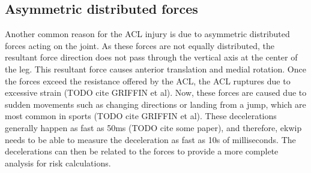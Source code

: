 \subsection{Asymmetric distributed forces}
Another common reason for the ACL injury is due to asymmetric distributed forces acting on the joint. As these forces are not equally distributed, the resultant force direction does not pass through the vertical axis at the center of the leg. This resultant force causes anterior translation and medial rotation. Once the forces exceed the resistance offered by the ACL,  the ACL ruptures due to excessive strain (TODO cite GRIFFIN et al). Now, these forces are caused due to sudden movements such as changing directions or landing from a jump, which are most common in sports (TODO cite GRIFFIN et al). These decelerations generally happen as fast as 50ms (TODO cite some paper), and therefore, ekwip needs to be able to measure the deceleration as fast as 10s of milliseconds. The decelerations can then be related to the forces to provide a more complete analysis for risk calculations.